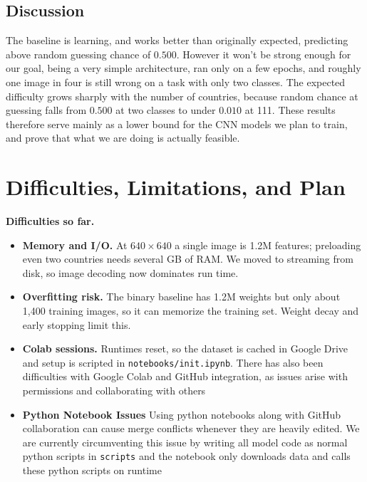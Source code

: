 \documentclass[conference]{IEEEtran}
\begin{document}
\subsection{Discussion}

The baseline is learning, and works better than originally expected, predicting above random guessing chance of $0.500$. However it won't be strong enough for our goal, being a very simple architecture, ran only on a few epochs, and roughly one image in four is still wrong on a task with
only two classes. The expected difficulty grows sharply with the number of
countries, because random chance at guessing falls from $0.500$ at two classes to under
$0.010$ at 111. These results therefore serve mainly as a lower bound for
the CNN models we plan to train, and prove that what we are doing is actually feasible.

\section{Difficulties, Limitations, and Plan}

\textbf{Difficulties so far.}
\begin{itemize}
  \item \textbf{Memory and I/O.} At $640\times640$ a single image is 1.2M
  features; preloading even two countries needs several GB of RAM. We moved
  to streaming from disk, so image decoding now dominates run time.
  \item \textbf{Overfitting risk.} The binary baseline has 1.2M weights but
  only about 1,400 training images, so it can memorize the training set.
  Weight decay and early stopping limit this.
  \item \textbf{Colab sessions.} Runtimes reset, so the dataset is cached in
  Google Drive and setup is scripted in \texttt{notebooks/init.ipynb}. There has also been difficulties with Google Colab and GitHub integration, as issues arise with permissions and collaborating with others
  \item \textbf{Python Notebook Issues} Using python notebooks along with GitHub collaboration can cause merge conflicts whenever they are heavily edited. We are currently circumventing this issue by writing all model code as normal python scripts in \texttt{scripts} and the notebook only downloads data and calls these python scripts on runtime
\end{itemize}
\end{document}
